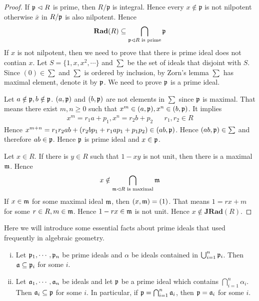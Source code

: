 \documentclass{amsart}
\begin{document}
\begin{proof}
	If $\mathfrak{p} \vartriangleleft R$ is prime, then $R/ \mathfrak{p}$ is integral. Hence every $x \notin \mathfrak{p}$ is not nilpotent otherwise $\bar{x}$ in $R/\mathfrak{p}$ is also nilpotent. Hence \[\mathbf{Rad}(R) \subseteq \bigcap_{\mathfrak{p} \vartriangleleft R\text{ is prime}} \mathfrak{p}\]
	If $x$ is not nilpotent, then we need to prove that there is prime ideal does not contian $x$. Let $S=\{ 1, x, x^2, \cdots\}$ and $\sum$ be the set of ideals that disjoint with $S$. Since $(0) \in \sum $ and $\sum$ is ordered by inclusion, by Zorn's lemma $\sum$ has maximal element, denote it by $\mathfrak{p}$. We need to prove $\mathfrak{p}$ is a prime ideal.
	
	Let $a \notin \mathfrak{p}, b \notin \mathfrak{p}$. $(a, \mathfrak{p})$ and $(b, \mathfrak{p})$ are not elements in $\sum$ since $\mathfrak{p}$ is maximal. That means there exist $m,n \geq 0$ such that $x^m \in (a, \mathfrak{p}), x^n \in (b, \mathfrak{p})$. It implies 
	\[
	\begin{aligned}
	x^m = r_1 a + p_1, x^n = r_2 b +p_2& & r_1, r_2 \in R
	\end{aligned}
	\]
	Hence $x^{m+n} = r_1 r_2 ab + (r_2 bp_1 + r_1 ap_1 + p_1 p_2) \in (ab, \mathfrak{p})$. Hence $(ab, \mathfrak{p}) \in \sum$ and therefore $ab \in \mathfrak{p}$. Hence $\mathfrak{p}$ is prime ideal and $x \in \mathfrak{p}$.
	
	Let $x \in R$. If there is $y\in R$ such that $1-xy$ is not unit, then there is a maximal $\mathfrak{m}$. Hence 
	\[
	x \notin \bigcap_{\mathfrak{m} \vartriangleleft R\text{ is maximal}} \mathfrak{m}
	\]
	If $x \in \mathfrak{m}$ for some maximal ideal $\mathfrak{m}$, then $(x, \mathfrak{m}) = (1)$. That means $1=rx + m$ for some $r \in R, m \in \mathfrak{m}$. Hence $1-rx \in \mathfrak{m}$ is not unit. Hence $x \notin \textbf{JRad}(R)$.
\end{proof}
Here we will introduce some essential facts about prime ideals that used frequently in algebraic geometry.

\begin{secprop}[\ref{}]
	\begin{enumerate}[(i)]
		\item Let $\mathfrak{p}_1, \cdots, \mathfrak{p}_n$ be prime ideals and $\alpha$ be ideals contained in $\bigcup_{i=1}^{n} \mathfrak{p}_i$. Then $\mathfrak{a} \subseteq \mathfrak{p}_i$ for some $i$.
		\item Let $\mathfrak{a}_1, \cdots, \mathfrak{a}_n$ be ideals and let $\mathfrak{p}$ be a prime ideal  which contains $\bigcap_{i=1}^{n} \alpha_i$. Then $\mathfrak{a}_i \subseteq \mathfrak{p}$ for some $i$. In particular, if $\mathfrak{p}= \bigcap_{i=1}^n \mathfrak{a}_i$, then $\mathfrak{p} = \mathfrak{a}_i$ for some $i$.
	\end{enumerate}
\end{secprop}
\end{document}
